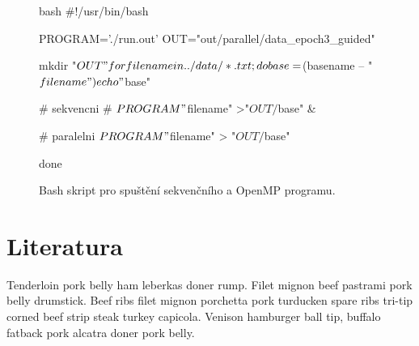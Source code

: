 \documentclass{article}
\begin{document}
    \begin{figure}[htp]
        \centering
        \begin{cminted}{bash}
            #!/usr/bin/bash

            PROGRAM='./run.out'
            OUT="out/parallel/data_epoch3_guided"

            mkdir "$OUT"

            for filename in ../data/*.txt; do
            base=$(basename -- "$filename")
            echo "$base"

            # sekvencni
            #  $PROGRAM "$filename" >"$OUT/$base" &

            # paralelni
            $PROGRAM "$filename" > "$OUT/$base"

            done
        \end{cminted}
        \caption{Bash skript pro spuštění sekvenčního a OpenMP programu.}
        \label{listing:shellrun}
    \end{figure}


    \section{Literatura}
    Tenderloin pork belly ham leberkas doner rump. Filet mignon beef pastrami pork belly drumstick. Beef ribs filet mignon porchetta pork turducken spare ribs tri-tip corned beef strip steak turkey capicola. Venison hamburger ball tip, buffalo fatback pork alcatra doner pork belly.
\end{document}
